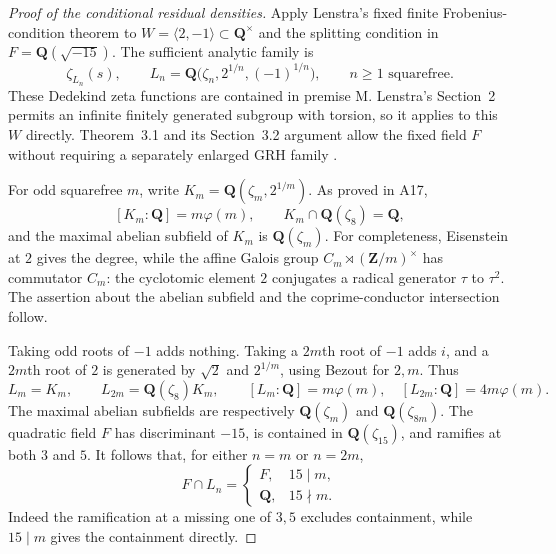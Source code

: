 \begin{proof}[Proof of the conditional residual densities]
Apply Lenstra's fixed finite Frobenius-condition theorem to
$W=\langle2,-1\rangle\subset\mathbf Q^\times$ and the
splitting condition in $F=\mathbf Q(\sqrt{-15})$.
The sufficient analytic family is
\[
 \zeta_{L_n}(s),\qquad
 L_n=\mathbf Q\bigl(\zeta_n,2^{1/n},(-1)^{1/n}\bigr),
                   \qquad n\ge1\text{ squarefree}.          \tag{SO.16}
\]
These Dedekind zeta functions are contained in premise M.
Lenstra's Section~2 permits an infinite finitely generated
subgroup with torsion, so it applies to this $W$ directly.
Theorem~3.1 and its Section~3.2 argument allow the fixed field
$F$ without requiring a separately enlarged GRH family
\cite[\S\S2--3, Theorem~3.1]{Lenstra1977}.

For odd squarefree $m$, write
$K_m=\mathbf Q(\zeta_m,2^{1/m})$.  As proved in A17,
\[
 [K_m:\mathbf Q]=m\varphi(m),\qquad
 K_m\cap\mathbf Q(\zeta_8)=\mathbf Q,
\]
and the maximal abelian subfield of $K_m$ is
$\mathbf Q(\zeta_m)$.  For completeness, Eisenstein at $2$
gives the degree, while the affine Galois group
$C_m\rtimes(\mathbf Z/m)^\times$ has commutator $C_m$:
the cyclotomic element $2$ conjugates a radical generator
$\tau$ to $\tau^2$.  The assertion about the abelian subfield
and the coprime-conductor intersection follow.

Taking odd roots of $-1$ adds nothing.  Taking a $2m$th root
of $-1$ adds $i$, and a $2m$th root of $2$ is generated by
$\sqrt2$ and $2^{1/m}$, using Bezout for $2,m$.  Thus
\[
 L_m=K_m,\qquad L_{2m}=\mathbf Q(\zeta_8)K_m,\qquad
 [L_m:\mathbf Q]=m\varphi(m),\quad
 [L_{2m}:\mathbf Q]=4m\varphi(m).                           \tag{SO.17}
\]
The maximal abelian subfields are respectively
$\mathbf Q(\zeta_m)$ and $\mathbf Q(\zeta_{8m})$.
The quadratic field $F$ has discriminant $-15$, is contained
in $\mathbf Q(\zeta_{15})$, and ramifies at both $3$ and $5$.
It follows that, for either $n=m$ or $n=2m$,
\[
 F\cap L_n=
 \begin{cases}
 F,&15\mid m,\\
 \mathbf Q,&15\nmid m.
 \end{cases}                                               \tag{SO.18}
\]
Indeed the ramification at a missing one of $3,5$ excludes
containment, while $15\mid m$ gives the containment directly.


\end{proof}
